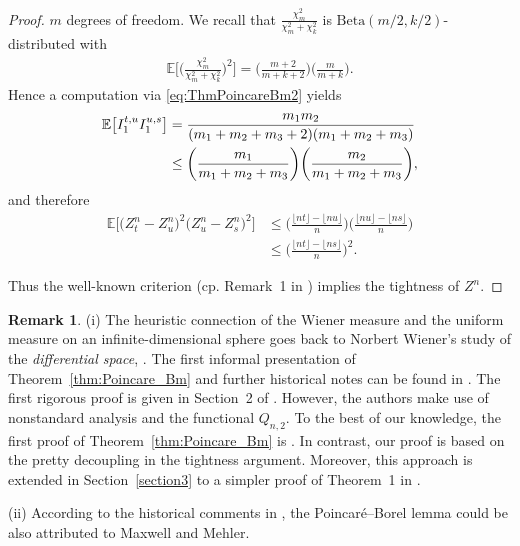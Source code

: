 \documentclass[numbers,compress,v1.0.1]{vmsta}
\theoremstyle{definition}
\newtheorem{remark}[theorem]{Remark}
\def\ex{\mathbb{E}}
\begin{document}
\begin{proof}
$m$ degrees of freedom. We recall that
$\frac{\chi^2_{m} }{\chi^2_{m} + \chi^2_{k}}$ is $\text{Beta}(m/2,
k/2)$-distributed with
%
\begin{align}
\label{eq:ThmPoincareBm2} \ex \biggl[ \biggl(\frac{\chi^2_{m} }{\chi^2_{m} + \chi^2_{k}} \biggr)^2 \biggr]
= \biggl(\frac{m+2}{m+k+2} \biggr) \biggl(\frac{m}{m+k} \biggr).
\end{align}
%
Hence a computation via \eqref{eq:ThmPoincareBm2} yields
%
\begin{align*}
\ex \bigl[I^{t,u}_1 I^{u,s}_1 \bigr]
&= \frac{m_1 m_2}{(m_1+m_2+m_3+2)(m_1+m_2+m_3)}
\\
&\leq \biggl(\frac{m_1}{m_1+m_2+m_3} \biggr)
\xch{\biggl(\frac{m_2}{m_1+m_2+m_3} \biggr),}%
{\biggl(\frac{m_2}{m_1+m_2+m_3} \biggr)}
\end{align*}
%
and therefore
%
\begin{align*}
\ex \bigl[\bigl(Z^n_t - Z^n_u
\bigr)^2 \bigl(Z^n_u - Z^n_s
\bigr)^2 \bigr] &\leq \biggl(\frac
{\lfloor nt \rfloor-\lfloor nu \rfloor}{n} \biggr) \biggl(
\frac{\lfloor
nu \rfloor-\lfloor ns \rfloor}{n} \biggr)
\\
&\leq \biggl(\frac{\lfloor nt \rfloor-\lfloor ns \rfloor}{n} \biggr)^2.
\end{align*}

Thus the well-known criterion \cite[Theorem~15.6]{Billi_alt} (cp.
Remark~1 in \cite{P}) implies the tightness of $Z^n$.
\end{proof}

\begin{remark}

(i) The heuristic connection of the Wiener measure and the uniform measure
on an infinite-dimensional sphere goes back to Norbert Wiener's study of the
\emph{differential space}, \cite{Wiener}. The first informal presentation of
Theorem~\ref{thm:Poincare_Bm} and further historical notes can be found in
\cite{McKean}. The first rigorous proof is given in Section~2 of
\cite{Cutland_Ng}. However, the authors make use of nonstandard analysis and
the functional $Q_{n,2}$. To the best of our knowledge, the first proof of
Theorem~\ref{thm:Poincare_Bm} is \cite{Rackauskas}. In contrast, our proof is
based on the pretty decoupling in the tightness argument. Moreover, this
approach is extended in Section~\ref{section3} to a simpler proof of Theorem~1 in \cite{Csorgo}.

(ii) According to the historical comments in \cite[Section~2.2]{Vershik}, the Poincar\'{e}--Borel lemma could be also attributed
to Maxwell and Mehler.
\end{remark}
\end{document}
